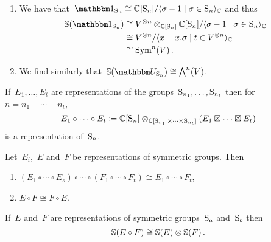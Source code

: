 \documentclass[a4paper,10pt]{scrartcl}
\begin{document}
\begin{example}
  \leavevmode
  \begin{enumerate}
    \item
      We have that~$\trivrep_{\symm_n} \cong \Complex[\symm_n]/\gen{\sigma - 1 \suchthat \sigma \in \symm_n}_{\Complex}$ and thus
      \begin{align*}
        \Schur( \trivrep_{\symm_n} )
        &\cong
        V^{\tensor n} \tensor_{\Complex[\symm_n]} \Complex[\symm_n]/\gen{\sigma - 1 \suchthat \sigma \in \symm_n}_{\Complex}
        \\
        &\cong
        V^{\tensor n}/\gen{x - x.\sigma \suchthat t \in V^{\tensor n}}_{\Complex}
        \\
        &\cong
        \Symm^n(V) \,.
      \end{align*}
    \item
      We find similarly that~$\Schur( \signrep_{\symm_n} ) \cong \Exterior^n(V)$.
  \end{enumerate}
\end{example}

If~$E_1, \dotsc, E_t$ are representations of the groups~$\operatorname{S}_{n_1}, \dotsc, \operatorname{S}_{n_t}$ then for~$n = n_1 + \dotsb + n_t$,
\[
  E_1 \circ \dotsb \circ E_t
  \coloneqq
  \mathbb{C}[\operatorname{S}_n]
  \otimes_{\mathbb{C}[\operatorname{S}_{n_1} \times \dotsb \times \operatorname{S}_{n_t}]}
  (E_1 \boxtimes \dotsb \boxtimes E_t)
\]
is a representation of~$\operatorname{S}_n$.

\begin{lemma}
  \label{properties of circle product}
  Let~$E_i$,~$E$ and~$F$ be representations of symmetric groups.
  Then
  \begin{enumerate}
    \item
      $(E_1 \circ \dotsb \circ E_s) \circ \dotsb \circ (F_1 \circ \dotsb \circ F_t) \cong E_1 \circ \dotsb \circ F_t$,
    \item
      $E \circ F \cong F \circ E$.
  \end{enumerate}
\end{lemma}

\begin{lemma}
  \label{multiplicativity of schur functor}
  If~$E$ and~$F$ are representations of symmetric groups~$\operatorname{S}_a$ and~$\operatorname{S}_b$ then
  \[
    \mathbb{S}(E \circ F) \cong \mathbb{S}(E) \otimes \mathbb{S}(F) \,.
  \]
\end{lemma}
\end{document}
